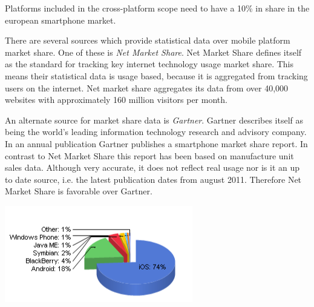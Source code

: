 
Platforms included in the cross-platform scope need to have a 10\% in share in the european smartphone market. 

There are several sources which provide statistical data over mobile platform market share. One of these is \emph{Net Market Share}. Net Market Share defines itself as the standard for tracking key internet technology usage market share. This means their statistical data is usage based, because it is aggregated from tracking users on the internet. Net market share aggregates its data from over 40,000 websites with approximately 160 million visitors per month.\cite{NetApplications2012}


An alternate source for market share data is \emph{Gartner}. Gartner describes itself as being the world's leading information technology research and advisory company.\cite{Gartner2012} In an annual publication Gartner publishes a smartphone market share report. In contrast to Net Market Share this report has been based on manufacture unit sales data. Although very accurate, it does not reflect real usage nor is it an up to date source, i.e. the latest publication dates from august 2011.\cite{Pettey2011} Therefore Net Market Share is favorable over Gartner.


\begin{centering}
\includegraphics[scale=0.5]{images/netmarketshare_march2012.png}\\
\end{centering}

